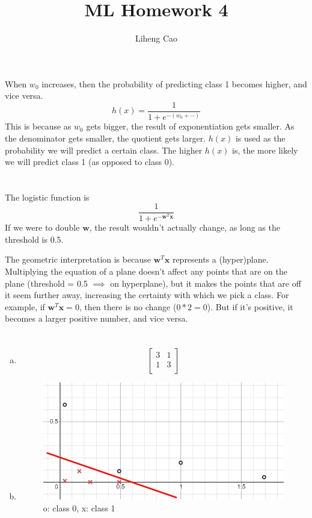 \documentclass[12pt]{article}
\title{ML Homework 4}
\author{Liheng Cao}
\begin{document}
\maketitle

\section{}
When $ w_0 $ increases, then the probability of predicting class 1 becomes higher, and vice versa. 
\[ h(x) = \dfrac{1}{1+e^{-(w_0 + \cdots)}} \]
This is because as $ w_0 $ gets bigger, the result of exponentiation gets smaller. As the denominator gets smaller, the quotient gets larger. $ h(x) $ is used as the probability we will predict a certain class. The higher $ h(x) $ is, the more likely we will predict class 1 (as opposed to class 0).
\newpage

\section{}
The logistic function is \[ \dfrac{1}{1+e^{-\textbf{w}^T \textbf{x}}} \]
If we were to double $ \textbf{w} $, the result wouldn't actually change, as long as the threshold is 0.5. 

The geometric interpretation is because $ \textbf{w}^T\textbf{x} $ represents a (hyper)plane. Multiplying the equation of a plane doesn't affect any points that are on the plane (threshold = 0.5 $\implies$ on hyperplane), but it makes the points that are off it seem further away, increasing the certainty with which we pick a class. For example, if $ \textbf{w}^T\textbf{x} = 0$, then there is no change ($ 0 * 2 = 0 $). But if it's positive, it becomes a larger positive number, and vice versa.
\newpage

\section{}
\begin{enumerate}[(a)]
	\item 
	\[\begin{bmatrix}
		3 & 1 \\
		1 & 3 \\
	\end{bmatrix}\]
	
	\item 
	\begin{figure}[H]
	    \centering
	    \includegraphics{assignments/intro to ml/ml hw4/images/3b.png}
	    \caption{o: class 0, x: class 1}
	    \label{fig:3:b}
	\end{figure}
\end{enumerate}
\end{document}

